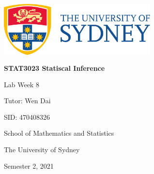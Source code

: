 \includegraphics[width=8cm]{./UsydLogo}

\vspace{1cm}


\horline
{\centering\bfseries \Large \textsc{STAT3023} Statiscal Inference

}
\horline

\vspace{3cm}

{\large \centering Lab Week 8

}

{\centering

\vspace{1cm}

Tutor: Wen Dai

SID: 470408326

\vspace{1cm}

School of Mathematics and Statistics

The University of Sydney

\vfill

Semester 2, 2021\newpage

}
